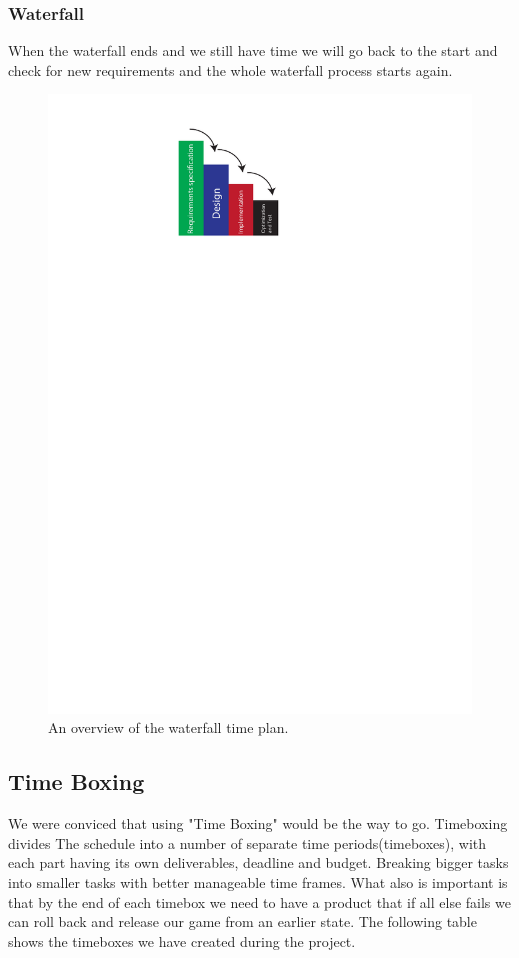 \subsubsection{Waterfall}
When the waterfall ends and we still have time
we will go back to the start and check for new requirements
and the whole waterfall process starts again.

\begin{figure}[h]
  \centering
  \includegraphics[scale=0.6]{Figures/Waterfall}
  \caption{An overview of the waterfall time plan.}
\label{fig:Waterfall}
\end{figure}
\subsection{Time Boxing} %
We were conviced that using "Time Boxing" would be the way to go.
Timeboxing divides The schedule into a number of separate time periods(timeboxes), with each part having its own deliverables, deadline and budget.
Breaking bigger tasks into smaller tasks with better manageable time frames.
What also is important is that by the end of each timebox we need to have a product that if all else fails we can roll back and release our game from an earlier state. The following table shows the timeboxes we have created during the project.

